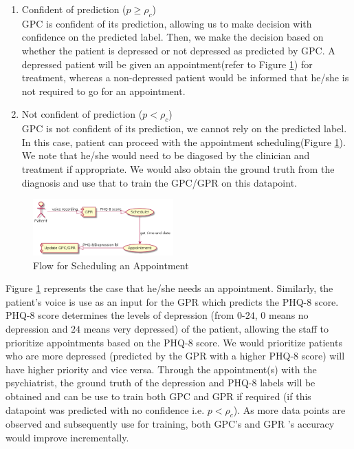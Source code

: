 \documentclass{article}
\begin{document}
	\begin{enumerate}
		\item {Confident of prediction ($p \geq \rho_c$)} \\
		GPC is confident of its prediction, allowing us to make decision with confidence on the predicted label.
		Then, we make the decision based on whether the patient is depressed or not depressed as predicted by GPC. 
		A depressed patient will be given an appointment(refer to Figure \ref{sch_app}) for treatment, whereas a non-depressed patient would be informed that he/she is not required to go for an appointment.
		\item {Not confident of prediction ($p < \rho_c$}) \\
		GPC is not confident of its prediction, we cannot rely on the predicted label. 
		In this case, patient can proceed with the appointment scheduling(Figure \ref{sch_app}). 
		We note that he/she would need to be diagosed by the clinician and treatment if appropriate. 
		We would also obtain the ground truth from the diagnosis and use that to train the GPC/GPR on this datapoint. 
	\end{enumerate}
	
	\begin{figure}[h]
 		\begin{center}
		\includegraphics[width=0.48\textwidth]{appointment} 
  		\end{center}
  		\caption{Flow for Scheduling an Appointment}
  		\label{sch_app} 
 	\end{figure}

	Figure \ref{sch_app} represents the case that he/she needs an appointment. 
	Similarly, the patient's voice is use as an input for the GPR which predicts the PHQ-8 score. 
	PHQ-8 score determines the levels of depression (from $0$-$24$, $0$ means no depression and $24$ means very depressed) of the patient, allowing the staff to prioritize appointments based on the PHQ-8 score.
	We would prioritize patients who are more depressed (predicted by the GPR with a higher PHQ-8 score) will have higher priority and vice versa.
	Through the appointment(s) with the psychiatrist, the ground truth of the depression and PHQ-8 labels will be obtained and can be use to train both GPC and GPR if required (if this datapoint was predicted with no confidence i.e. $p < \rho_c$).
	As more data points are observed and subsequently use for training, both GPC's and GPR 's accuracy would improve incrementally.
\end{document}
